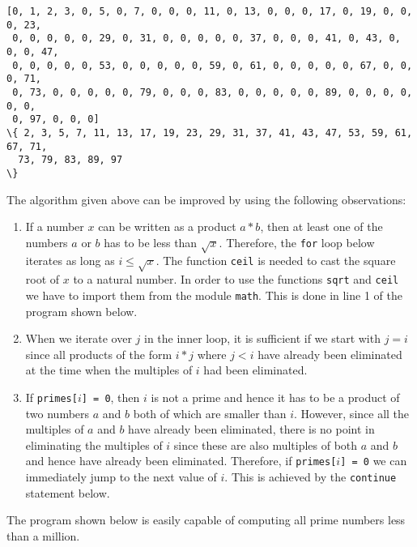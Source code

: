 \begin{Verbatim}[commandchars=\\\{\}]
[0, 1, 2, 3, 0, 5, 0, 7, 0, 0, 0, 11, 0, 13, 0, 0, 0, 17, 0, 19, 0, 0, 0, 23,
 0, 0, 0, 0, 0, 29, 0, 31, 0, 0, 0, 0, 0, 37, 0, 0, 0, 41, 0, 43, 0, 0, 0, 47,
 0, 0, 0, 0, 0, 53, 0, 0, 0, 0, 0, 59, 0, 61, 0, 0, 0, 0, 0, 67, 0, 0, 0, 71,
 0, 73, 0, 0, 0, 0, 0, 79, 0, 0, 0, 83, 0, 0, 0, 0, 0, 89, 0, 0, 0, 0, 0, 0,
 0, 97, 0, 0, 0]
\{ 2, 3, 5, 7, 11, 13, 17, 19, 23, 29, 31, 37, 41, 43, 47, 53, 59, 61, 67, 71,
  73, 79, 83, 89, 97
\}
\end{Verbatim}
The algorithm given above can be improved by using the following observations:
\begin{enumerate}
\item If a number $x$ can be written as a product $a * b$, then at least one of the numbers $a$ or $b$ has to
      be less than $\sqrt{x}$.  Therefore, the \texttt{for} loop below iterates as long as $i \leq
      \sqrt{x}$.
      The function \texttt{ceil} is needed to cast the square root of $x$ to a natural number.  In
      order to use the functions \texttt{sqrt} and \texttt{ceil} we have to import them from the module
      \texttt{math}.   This is done in line 1 of the program shown below.  
\item When we iterate over $j$ in the inner loop, it is sufficient if we start with $j = i$ since all products
      of the form $i * j$ where $j < i$ have already been eliminated at the time when the multiples of $i$ had
      been eliminated. 
\item If \texttt{primes[$i$] = 0}, then $i$ is not a prime and hence it has to be a product of two numbers $a$
      and $b$ both of which are smaller than $i$.  However, since all the multiples of $a$ and $b$ have already
      been eliminated, there is no point in eliminating the multiples of $i$ since these are also multiples of both
      $a$ and $b$ and hence have already been eliminated.  Therefore, if \texttt{primes[$i$] = 0} we can
      immediately jump to the next value of $i$.  This is achieved by the \texttt{continue} statement 
      below. 
\end{enumerate}
The program shown below is easily capable of computing all prime numbers less than a million.

